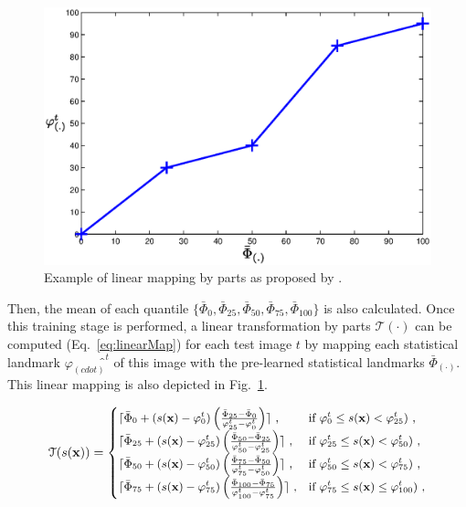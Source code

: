 \begin{enumerate}[leftmargin=*]
\begin{figure}
	\centering
	\includegraphics[width=0.7\linewidth]{3_review/figures/processing/pre-processing/normalization/linear_transform_parts.eps}
	\caption{Example of linear mapping by parts as proposed by \cite{Nyul2000}.}
	\label{fig:imnorm}
\end{figure}

Then, the mean of each quantile $\{ \bar{\Phi}_{0}, \bar{\Phi}_{25}, \bar{\Phi}_{50}, \bar{\Phi}_{75}, \bar{\Phi}_{100} \}$ is also calculated.
Once this training stage is performed, a linear transformation by parts $\mathcal{T}(\cdot)$ can be computed (Eq.~\eqref{eq:linearMap}) for each test image $t$ by mapping each statistical landmark $\varphi_{(cdot)}̂^{t}$ of this image with the pre-learned statistical landmarks $\bar{\Phi}_{(\cdot)}$.
This linear mapping is also depicted in Fig.~\ref{fig:imnorm}.

\begin{equation}
\small
\mathcal{T}(s(\mathbf{x})) =
  \begin{cases}
    \lceil \bar{\Phi}_{0}+( s(\mathbf{x}) - \varphi_{0}^{t} ) \left( \frac{\bar{\Phi}_{25} - \bar{\Phi}_{0}}{\varphi_{25}^{t} - \varphi_{0}^{t}} \right) \rceil \ , & \text{if $\varphi_{0}^{t} \leq s(\mathbf{x})<\varphi_{25}^{t})$} \ , \\
    \lceil \bar{\Phi}_{25}+( s(\mathbf{x}) - \varphi_{25}^{t} ) \left( \frac{\bar{\Phi}_{50} - \bar{\Phi}_{25}}{\varphi_{50}^{t} - \varphi_{25}^{t}} \right) \rceil \ , & \text{if $\varphi_{25}^{t} \leq s(\mathbf{x})<\varphi_{50}^{t})$} \ , \\
    \lceil \bar{\Phi}_{50}+( s(\mathbf{x}) - \varphi_{50}^{t} ) \left( \frac{\bar{\Phi}_{75} - \bar{\Phi}_{50}}{\varphi_{75}^{t} - \varphi_{50}^{t}} \right) \rceil \ , & \text{if $\varphi_{50}^{t} \leq s(\mathbf{x})<\varphi_{75}^{t})$} \ , \\
    \lceil \bar{\Phi}_{75}+( s(\mathbf{x}) - \varphi_{75}^{t} ) \left( \frac{\bar{\Phi}_{100} - \bar{\Phi}_{75}}{\varphi_{100}^{t} - \varphi_{75}^{t}} \right) \rceil \ , & \text{if $\varphi_{75}^{t} \leq s(\mathbf{x})\leq \varphi_{100}^{t})$} \ ,
  \end{cases}
  \label{eq:linearMap}
\end{equation}


\end{enumerate}

